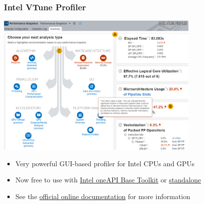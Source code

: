 \begin{frame}[fragile]
  \frametitle{Intel VTune Profiler}
  \centering
  \includegraphics[width=0.75\textwidth]{tools/vtune.png}
  \begin{itemize}
    \item Very powerful GUI-based profiler for Intel CPUs and GPUs
    \item Now free to use with
      \href{https://www.intel.com/content/www/us/en/developer/tools/oneapi/toolkits.html}{Intel oneAPI Base Toolkit} or
      \href{https://www.intel.com/content/www/us/en/developer/tools/oneapi/vtune-profiler.html}{standalone}
    \item See the \href{https://www.intel.com/content/www/us/en/develop/documentation/vtune-help/}
                       {official online documentation} for more information
  \end{itemize}
\end{frame}
